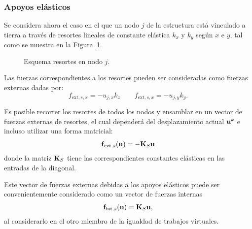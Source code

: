 
\subsubsection{Apoyos elásticos}

Se considera ahora el caso en el que un nodo $j$ de la estructura está vinculado a tierra a través de resortes lineales de constante elástica $k_x$ y $k_y$ según $x$ e $y$, tal como se muestra en la Figura~\ref{fig:apoyoselas}.

\begin{figure}[htb]
	\centering
	\def\svgwidth{0.32\textwidth}
    
	\caption{Esquema resortes en nodo $j$.}
	\label{fig:apoyoselas}
\end{figure}

Las fuerzas correspondientes a los resortes pueden ser consideradas como fuerzas externas dadas por:
%
\begin{equation}
f_{\text{ext},s,x} = - u_{j,x} k_x \qquad f_{\text{ext},s,x} = - u_{j,y} k_y .
\end{equation}

Es posible recorrer los resortes de todos los nodos y ensamblar en un vector de fuerzas externas de resortes, el cual dependerá del desplazamiento actual ${\bf u}^k$ e incluso utilizar una forma matricial:
%
\begin{equation}
{\bf f}_{\text{ext},s} ({\bf u}) = -{\bf K}_S {\bf u}
\end{equation}
donde la matriz ${\bf K}_S$ tiene las correspondientes constantes elásticas en las entradas de la diagonal. %
%

Este vector de fuerzas externas debidas a los apoyos elásticos puede ser convenientemente considerado como un vector de fuerzas internas
\begin{equation}
{\bf f}_{\text{int},s} ({\bf u}) = {\bf K}_S {\bf u},
\end{equation}
al considerarlo en el otro miembro de la igualdad de trabajos virtuales. %
%




